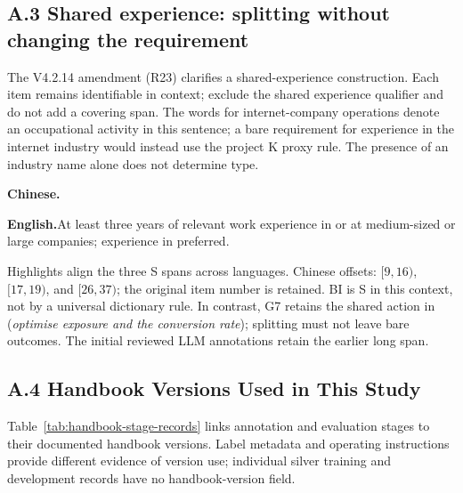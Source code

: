 \subsection{A.3 Shared experience: splitting without changing the requirement}
The V4.2.14 amendment (R23) clarifies a shared-experience construction. Each item remains identifiable in context; exclude the shared experience qualifier and do not add a covering span. The words for internet-company operations denote an occupational activity in this sentence; a bare requirement for experience in the internet industry would instead use the project K proxy rule. The presence of an industry name alone does not determine type.

\smallskip\noindent
\begin{minipage}{\linewidth}\small\RaggedRight
\textbf{Chinese.}\enspace{}
\par\smallskip
\textbf{English.}\enspace At least three years of relevant work experience in  or  at medium-sized or large companies; experience in  preferred.
\par\smallskip
Highlights align the three S spans across languages. Chinese offsets: $[9,16)$, $[17,19)$, and $[26,37)$; the original item number is retained. BI is S in this context, not by a universal dictionary rule. In contrast, G7 retains the shared action in  (\emph{optimise exposure and the conversion rate}); splitting must not leave bare outcomes. The initial reviewed LLM annotations retain the earlier long span.
\end{minipage}

\subsection{A.4 Handbook Versions Used in This Study}
\label{sec:guide-version-history}
Table~\ref{tab:handbook-stage-records} links annotation and evaluation stages to their documented handbook versions. Label metadata and operating instructions provide different evidence of version use; individual silver training and development records have no handbook-version field.


